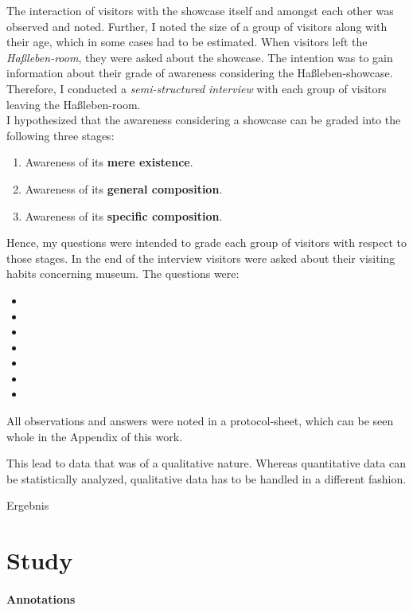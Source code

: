 The interaction of visitors with the showcase itself and amongst each other was observed and noted. Further, I noted the size of a group of visitors along with their age, which in some cases had to be estimated. When visitors left the \textit{Haßleben-room}, they were asked about the showcase. The intention was to gain information about their grade of awareness considering the Haßleben-showcase. Therefore, I conducted a \textit{semi-structured interview} with each group of visitors leaving the Haßleben-room. 
\\
I hypothesized that the awareness considering a showcase can be graded into the following three stages:
\begin{enumerate}
	\item Awareness of its \textbf{mere existence}.
	\item Awareness of its \textbf{general composition}.
	\item Awareness of its \textbf{specific composition}.
\end{enumerate}  
Hence, my questions were intended to grade each group of visitors with respect to those stages. In the end of the interview visitors were asked about their visiting habits concerning museum. The questions were:
\begin{itemize}
	\item 
	\item 
	\item 
	\item 
	\item 
	\item 
	\item 
\end{itemize}
All observations and answers were noted in a protocol-sheet, which can be seen whole in the Appendix of this work. 

This lead to data that was of a qualitative nature. Whereas quantitative data can be statistically analyzed, qualitative data has to be handled in a different fashion.

Ergebnis


\section{Study}
\label{evaluation_study}

\paragraph{Annotations}

